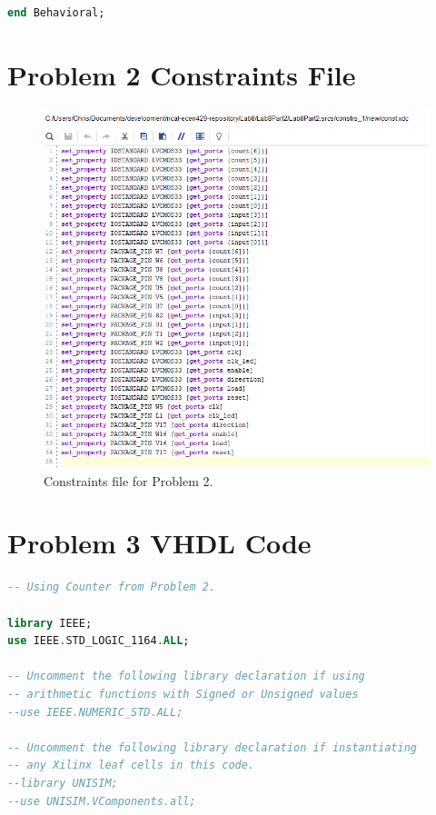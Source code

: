 \documentclass[11pt]{article}
\begin{document}
\begin{appendices}
\begin{lstlisting}[language=VHDL]
end Behavioral;
\end{lstlisting}

\section{Problem 2 Constraints File}
\begin{center}
\begin{figure}[H]
	\includegraphics[scale=1]{./images/const2.png}
	\caption{\label{fig:Prob2Const}Constraints file for Problem 2.}
\end{figure}
\end{center}

\section{Problem 3 VHDL Code}
\begin{lstlisting}[language=VHDL]
-- Using Counter from Problem 2.

library IEEE;
use IEEE.STD_LOGIC_1164.ALL;

-- Uncomment the following library declaration if using
-- arithmetic functions with Signed or Unsigned values
--use IEEE.NUMERIC_STD.ALL;

-- Uncomment the following library declaration if instantiating
-- any Xilinx leaf cells in this code.
--library UNISIM;
--use UNISIM.VComponents.all;


\end{lstlisting}
\end{appendices}
\end{document}
